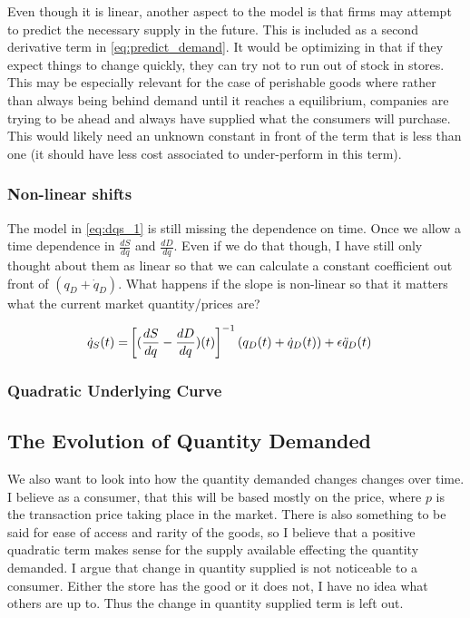 \documentclass{article}
\begin{document}
Even though it is linear, another aspect to the model is that firms may attempt to predict the necessary supply in the future. This is included as a second derivative term in \eqref{eq:predict_demand}.
It would be optimizing in that if they expect things to change quickly, they can try not to run out of stock in stores. This may be especially relevant for the case of perishable goods where rather than always being behind demand until it reaches a equilibrium, companies are trying to be ahead and always have supplied what the consumers will purchase. This would likely need an unknown constant in front of the term that is less than one (it should have less cost associated to under-perform in this term). 




\subsubsection{Non-linear shifts}
The model in \ref{eq:dqs_1} is still missing the dependence on time. Once we allow a time dependence in $\frac{dS}{dq}$ and $\frac{dD}{dq}$. Even if we do that though, I have still only thought about them as linear so that we can calculate a constant coefficient out front of $(q_D +\dot{q}_D)$. What happens if the slope is non-linear so that it matters what the current market quantity/prices are?

\begin{align}
	\dot{q}_S(t) = & \left[(\frac{dS}{dq} - \frac{dD}{dq})(t)\right]^{-1}(q_D(t) +\dot{q}_D(t)) +\epsilon\ddot{q}_D(t) \label{eq:dqs_2}
\end{align}

\subsubsection{Quadratic Underlying Curve}


\subsection{The Evolution of Quantity Demanded}
We also want to look into how the quantity demanded changes changes over time. I believe as a consumer, that this will be based mostly on the price, where $p$ is the transaction price taking place in the market. There is also something to be said for ease of access and rarity of the goods, so I believe that a positive quadratic term makes sense for the supply available effecting the quantity demanded. I argue that change in quantity supplied is not noticeable to a consumer. Either the store has the good or it does not, I have no idea what others are up to. Thus the change in quantity supplied term is left out. 
\end{document}
